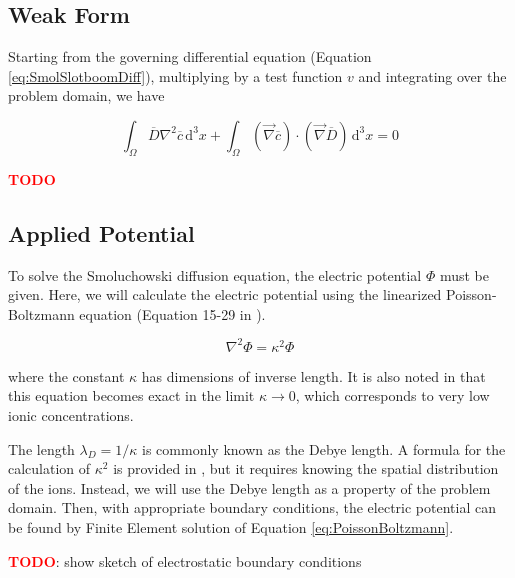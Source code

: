 \subsection{Weak Form}\label{subsec:unhom_smol_weak}

Starting from the governing differential equation (Equation \ref{eq:SmolSlotboomDiff}),
multiplying by a test function $v$ and integrating over the problem domain, we have

\begin{equation}
\int_{\Omega} \overline{D} \nabla^2 \overline{c} \,\mathrm{d}^3x 
+ \int_{\Omega} \left( \vec{\nabla} \overline{c} \right) \cdot \left( \vec{\nabla} \overline{D} \right) \,\mathrm{d}^3x = 0
\end{equation}

\textcolor{red}{\textbf{TODO}}

\subsection{Applied Potential}\label{subsec:unhom_smol_potential}

To solve the Smoluchowski diffusion equation, the electric potential $\Phi$ must be given.
Here, we will calculate the electric potential using the linearized Poisson-Boltzmann equation
(Equation 15-29 in \cite{McQuarrie-StatMech}).

\begin{equation}\label{eq:PoissonBoltzmann}
\nabla^2 \Phi = \kappa^2 \Phi
\end{equation}

where the constant $\kappa$ has dimensions of inverse length.
It is also noted in \cite{McQuarrie-StatMech} that this equation becomes exact
in the limit $\kappa \rightarrow 0$,
which corresponds to very low ionic concentrations.

The length $\lambda_D = 1/\kappa$ is commonly known as the Debye length.
A formula for the calculation of $\kappa^2$ is provided in \cite{McQuarrie-StatMech},
but it requires knowing the spatial distribution of the ions.
Instead, we will use the Debye length as a property of the problem domain.
Then, with appropriate boundary conditions,
the electric potential can be found by Finite Element solution of Equation \ref{eq:PoissonBoltzmann}.

\textcolor{red}{\textbf{TODO}}: show sketch of electrostatic boundary conditions

